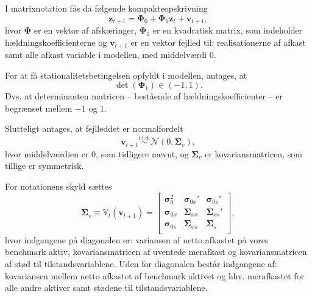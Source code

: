 \documentclass[
  a4paper,
  oneside]{memoir}
\begin{document}
\vspace{5mm}

I matrixnotation fås da følgende kompakteopskrivning
\begin{equation}\label{eq:1}
        \bm{z}_{t+1}=\bm{\Phi}_0+\bm{\Phi}_1\bm{z}_t+\bm{v}_{t+1},
    \end{equation}
hvor \(\bm{\Phi}\) er en vektor af afskæringer, \(\bm{\Phi}_1\) er en kvadratisk matrix, som indeholder hældningskoefficienterne og \(\bm{v}_{t+1}\) er en vektor fejlled til: realisationerne af afkast samt alle afkast variable i modellen, med middelværdi \(0\).

\vspace{5mm}

For at få stationalitetsbetingelsen opfyldt i modellen, antages, at
\begin{equation*}
        \det(\bm{\Phi}_1)\in(-1,1).
    \end{equation*}
Dvs. at determinanten matricen -- bestående af hældningskoefficienter -- er begrænset mellem \(-1\) og \(1\).

\vspace{5mm}

Slutteligt antages, at fejlleddet er normalfordelt
\begin{equation}\label{eq:2}
        \bm{v}_{t+1}\overset{\text{i.i.d.}}{\sim}\mathcal{N}(0,\bm{\Sigma}_v),
    \end{equation}
hvor middelværdien er \(0\), som tidligere nævnt, og \(\bm{\Sigma}_v\) er kovariansmatricen, som tillige er symmetrisk.

For notationens skyld sættes
\begin{equation*}
        \bm{\Sigma}_v\equiv \mathbb{V}_t(\bm{v}_{t+1})=
        \begin{bmatrix}
        \bm{\sigma}_0^2 & \bm{\sigma}_{0x}' & \bm{\sigma}_{0s}'\\
        \bm{\sigma}_{0x} & \bm{\Sigma}_{xx} & \bm{\Sigma}_{xs}'\\
        \bm{\sigma}_{0s} & \bm{\Sigma}_{xs} & \bm{\Sigma}_{s}\\
        \end{bmatrix},
    \end{equation*}
hvor indgangene på diagonalen er: variansen af netto afkastet på vores benchmark aktiv, kovariansmatricen af uventede merafkast og kovariansmatricen af stød til tilstandsvariablene. Uden for diagonalen består indgangene af: kovariansen mellem netto afkastet af benchmark aktivet og hhv. merafkastet for alle andre aktiver samt stødene til tilstandsvariablene.
\end{document}
